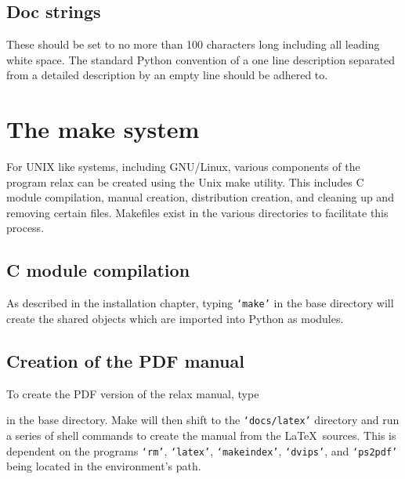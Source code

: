 \subsection{Doc strings}

These should be set to no more than 100 characters long including all leading white space.  The standard Python convention of a one line description separated from a detailed description by an empty line should be adhered to.




\section{The make system}

For UNIX like systems, including GNU/Linux, various components of the program relax can be created using the Unix make utility.  This includes C module compilation, manual creation, distribution creation, and cleaning up and removing certain files.  Makefiles exist in the various directories to facilitate this process.


\subsection{C module compilation}

As described in the installation chapter, typing \texttt{`make'} in the base directory will create the shared objects which are imported into Python as modules.


\subsection{Creation of the PDF manual}

To create the PDF version of the relax manual, type


in the base directory.  Make will then shift to the \texttt{`docs/latex'} directory and run a series of shell commands to create the manual from the \LaTeX\ sources.  This is dependent on the programs \texttt{`rm'}, \texttt{`latex'}, \texttt{`makeindex'}, \texttt{`dvips'}, and \texttt{`ps2pdf'} being located in the environment's path.


